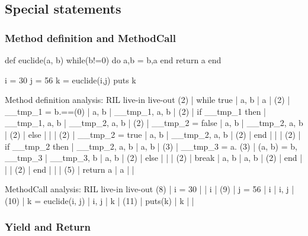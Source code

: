 \documentclass[a4paper]{article}   %
\begin{document}
\subsection{Special statements}

\subsubsection*{Method definition and MethodCall}

\begin{ruby}
def euclide(a, b)
    while(b!=0) do
        a,b = b,a%
    end
    return a
end

i = 30
j = 56
k = euclide(i,j)
puts k
\end{ruby}

\begin{bash}
Method definition analysis:
      RIL                         live-in         live-out
(2) | while true                | a, b          | a             | 
(2) |    __tmp_1 = b.==(0)      | a, b          | __tmp_1, a, b | 
(2) |    if __tmp_1 then        | __tmp_1, a, b | __tmp_2, a, b | 
(2) |       __tmp_2 = false     | a, b          | __tmp_2, a, b | 
(2) |    else                   |               |               | 
(2) |       __tmp_2 = true      | a, b          | __tmp_2, a, b | 
(2) |    end                    |               |               | 
(2) |    if __tmp_2 then        | __tmp_2, a, b | a, b          | 
(3) |       __tmp_3 = a.%
(3) |       (a, b) = b, __tmp_3 | __tmp_3, b    | a, b          | 
(2) |    else                   |               |               | 
(2) |       break               | a, b          | a, b          | 
(2) |    end                    |               |               | 
(2) | end                       |               |               | 
(5) | return a                  | a             |               | 

MethodCall analysis:
       RIL                        live-in         live-out
(8)  | i = 30                   |               | i             | 
(9)  | j = 56                   | i             | i, j          | 
(10) | k = euclide(i, j)        | i, j          | k             | 
(11) | puts(k)                  | k             |               | 
\end{bash}

\subsubsection*{Yield and Return}
\end{document}
